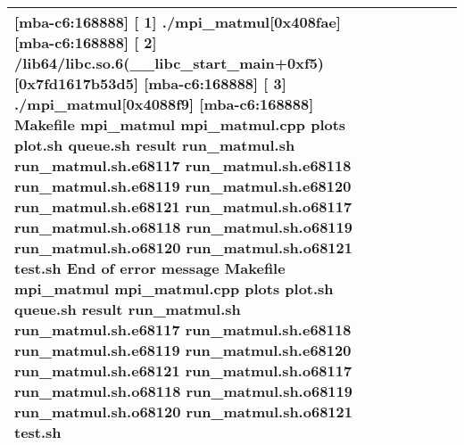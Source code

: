 \documentclass{article}
\begin{document}
\begin{tabular} { | l | l | l | l | l | l | }
[mba-c6:168888] [ 1] ./mpi_matmul[0x408fae] [mba-c6:168888] [ 2] /lib64/libc.so.6(__libc_start_main+0xf5)[0x7fd1617b53d5] [mba-c6:168888] [ 3] ./mpi_matmul[0x4088f9] [mba-c6:168888] Makefile mpi_matmul mpi_matmul.cpp plots plot.sh queue.sh result run_matmul.sh run_matmul.sh.e68117 run_matmul.sh.e68118 run_matmul.sh.e68119 run_matmul.sh.e68120 run_matmul.sh.e68121 run_matmul.sh.o68117 run_matmul.sh.o68118 run_matmul.sh.o68119 run_matmul.sh.o68120 run_matmul.sh.o68121 test.sh End of error message Makefile mpi_matmul mpi_matmul.cpp plots plot.sh queue.sh result run_matmul.sh run_matmul.sh.e68117 run_matmul.sh.e68118 run_matmul.sh.e68119 run_matmul.sh.e68120 run_matmul.sh.e68121 run_matmul.sh.o68117 run_matmul.sh.o68118 run_matmul.sh.o68119 run_matmul.sh.o68120 run_matmul.sh.o68121 test.sh \\ \hline
\hline
\end{tabular}
\end{document}
